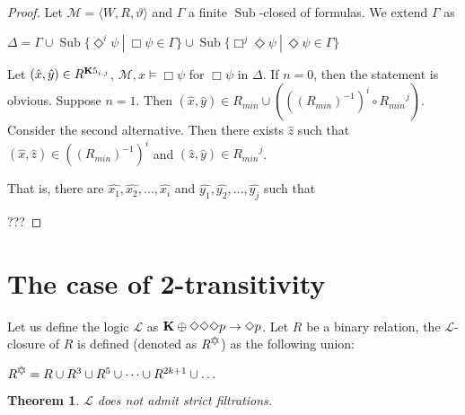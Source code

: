 \documentclass[a4paper]{article}
\theoremstyle{defin}
\theoremstyle{theorem}
\newtheorem{theorem}{Theorem}
\theoremstyle{prop}
\theoremstyle{lemma}
\theoremstyle{fact}
\theoremstyle{exercise}
\theoremstyle{ex}
\theoremstyle{col}
\theoremstyle{claim}
\begin{document}
\begin{proof}
  Let $\mathcal{M} = \langle W, R, \vartheta \rangle$ and $\Gamma$ a finite $\operatorname{Sub}$-closed of formulas. We extend $\Gamma$ as
  \begin{center}
    $\Delta = \Gamma \cup \operatorname{Sub}\{  \Diamond^{i} \psi \: | \: \Box \psi \in \Gamma \} \cup \operatorname{Sub}\{ \Box^{j} \Diamond \psi \: | \: \Diamond \psi \in \Gamma \}$
  \end{center}
  Let $(\hat{x}, \hat{y}) \in R^{{\bf K}5_{i,j}}$, $\mathcal{M}, x \models \Box \psi$ for $\Box \psi$ in $\Delta$.
  If $n = 0$, then the statement is obvious. Suppose $n = 1$.
  Then $(\hat{x}, \hat{y}) \in R_{min} \cup (((R_{min})^{-1})^i \circ {R_{min}}^j)$. Consider the second alternative. Then there exists $\hat{z}$ such that $(\hat{x}, \hat{z}) \in ((R_{min})^{-1})^i $ and $(\hat{z}, \hat{y}) \in {R_{min}}^j$.

  That is, there are $\hat{x_1}, \hat{x_2}, \dots, \hat{x_i}$ and $\hat{y_1}, \hat{y_2}, \dots, \hat{y_j}$ such that


  ???
\end{proof}

\section{The case of 2-transitivity}


Let us define the logic $\mathcal{L}$ as ${\bf K} \oplus \Diamond \Diamond \Diamond p \to \Diamond p$. Let $R$ be a binary relation, the $\mathcal{L}$-closure of $R$ is defined (denoted as $R^{\davidsstar}$) as the following union:
\begin{center}
  $R^{\davidsstar} = R \cup R^3 \cup R^5 \cup \dots \cup R^{2k+1} \cup \dots$
\end{center}

\begin{theorem}
  $\mathcal{L}$ does not admit strict filtrations.
\end{theorem}
\end{document}
